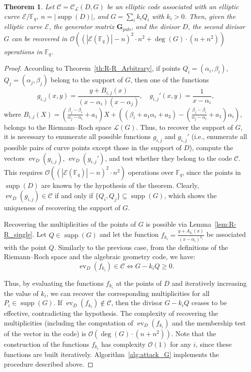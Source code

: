 \documentclass[sn-mathphys-num]{sn-jnl_modified}
\newtheorem{theorem}{Theorem}[subsection]
\begin{document}
\begin{theorem}\label{th:my_attack_G}
Let $\mathcal{C} = \mathcal{C}_\mathscr{L}(D, G)$ be an elliptic code associated with an elliptic curve $\mathcal{E}/\mathbb{F}_q$, $n = |\operatorname{supp}(D)|$, and $G = \sum_i k_i Q_i$ with $k_i > 0$. Then, given the elliptic curve $\mathcal{E}$, the generator matrix $\mathbf{G}_{\operatorname{pub}}$, and the divisor $D$, the second divisor $G$ can be recovered in $\mathcal{O}\!\left(\!\left(|\mathcal{E}(\mathbb{F}_q)| - n\right)^2 \cdot n^2 + \deg(G)\cdot (n + n^2)\right)$ operations in $\mathbb{F}_q$.
\end{theorem}
\begin{proof}
According to Theorem~\ref{th:R-R_Arbitrary}, if points $Q_i=(\alpha_i, \beta_i)$, $Q_j=(\alpha_j, \beta_j)$ belong to the support of $G$, then one of the functions
\[
g_{i,j}(x, y) = \frac{y + B_{i,j}(x)}{(x - \alpha_i)(x - \alpha_j)}, \quad g_{i,j}'(x, y) = \frac{1}{x - \alpha_i},
\]
where $B_{i,j}(X) = \left( \frac{\beta_j - \beta_i}{\alpha_j - \alpha_i} + a_1 \right) X + \left( (\beta_i + a_1\alpha_i + a_3) - \left( \frac{\beta_j - \beta_i}{\alpha_j - \alpha_i} + a_1 \right) \alpha_i \right)$, belongs to the Riemann--Roch space $\mathscr{L}(G)$. Thus, to recover the support of $G$, it is necessary to enumerate all possible functions $g_{i,j}$ and $g_{i,j}'$ (i.e., enumerate all possible pairs of curve points except those in the support of $D$), compute the vectors $\operatorname{ev}_D(g_{i,j})$, $\operatorname{ev}_D(g_{i,j}')$, and test whether they belong to the code $\mathcal{C}$. This requires $\mathcal{O}\!\left(\!\left(|\mathcal{E}(\mathbb{F}_q)| - n\right)^2 \cdot n^2\right)$ operations over $\mathbb{F}_q$, since the points in $\operatorname{supp}(D)$ are known by the hypothesis of the theorem. Clearly, $\operatorname{ev}_D(g_{i,j}) \in \mathcal{C}$ if and only if $\{Q_i, Q_j\} \subseteq \operatorname{supp}(G)$, which shows the uniqueness of recovering the support of $G$.

Recovering the multiplicities of the points of $G$ is possible via Lemma~\ref{lem:R-R_single}. Let $Q \in \operatorname{supp}(G)$ and let the function $f_{k_i}= \frac{y + A_{k_i}(x)}{(x - \alpha_i)^{k_i}}$ be associated with the point $Q$. Similarly to the previous case, from the definitions of the Riemann--Roch space and the algebraic geometry code, we have:
\[
\operatorname{ev}_D(f_{k_i}) \in \mathcal{C} \iff G - k_i Q \geq 0. 
\]

Thus, by evaluating the functions $f_{k_i}$ at the points of $D$ and iteratively increasing the value of $k_i$, we can recover the corresponding multiplicities for all $P_i \in \operatorname{supp}(G)$. If $\operatorname{ev}_D(f_{k_i}) \not\in \mathcal{C}$, then the divisor $G - k_i Q$ ceases to be effective, contradicting the hypothesis. The complexity of recovering the multiplicities (including the computation of $\operatorname{ev}_D(f_{k_i})$ and the membership test of the vector in the code) is $\mathcal{O}(\deg(G) \cdot (n + n^2))$. Note that the construction of the functions $f_{k_i}$ has complexity $\mathcal{O}(1)$ for any $i$, since these functions are built iteratively. Algorithm~\ref{alg:attack_G} implements the procedure described above.
\end{proof}
\end{document}
